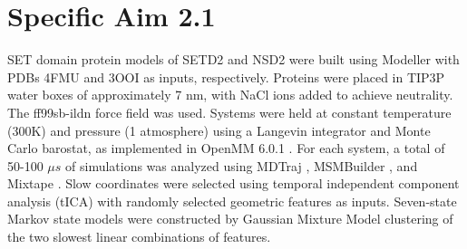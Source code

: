 \documentclass[12pt]{article}
\begin{document}
\section{Specific Aim 2.1}

SET domain protein models of SETD2 and NSD2 were built using Modeller with PDBs 4FMU and 3OOI as inputs, respectively.  Proteins were placed in TIP3P water boxes of approximately 7 nm, with NaCl ions added to achieve neutrality.  The ff99sb-ildn force field \cite{} was used.  Systems were held at constant temperature (300K) and pressure (1 atmosphere) using a Langevin integrator and Monte Carlo barostat, as implemented in OpenMM 6.0.1 \cite{}.  For each system, a total of 50-100 $\mu s$ of simulations was analyzed using MDTraj \cite{}, MSMBuilder \cite{}, and Mixtape \cite{}.  Slow coordinates were selected using temporal independent component analysis (tICA) \cite{} with randomly selected geometric features as inputs.  Seven-state Markov state models were constructed by Gaussian Mixture Model clustering of the two slowest linear combinations of features.
\end{document}
